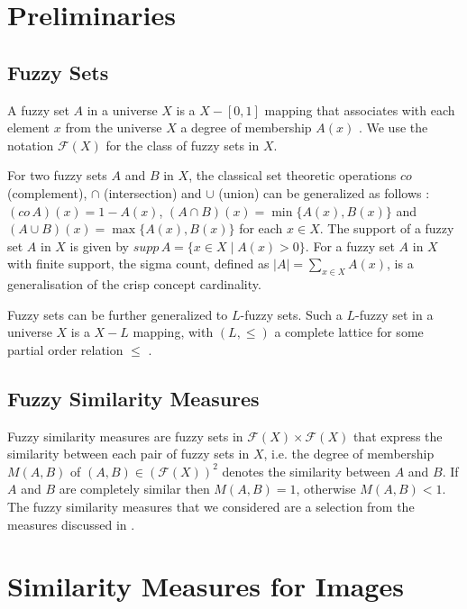 \documentclass[twocolumn]{phdsymp} %
\begin{document}
\section{Preliminaries}

\subsection{Fuzzy Sets}

A fuzzy set $A$ in a universe $X$ is a $X-[0,1]$ mapping that associates with each element
$x$ from the universe $X$ a degree of membership $A(x)$ \cite{kerre:vaagmodellen}. 
We use the notation ${\mathcal{F}}(X)$ for the class of fuzzy sets in $X$. 

For two fuzzy 
sets $A$ and $B$ in $X$, the classical set theoretic operations $co$ (complement), $\cap$ 
(intersection) and $\cup$ (union) can be generalized as follows 
\cite{kerre:vaagmodellen}: 
$(co\,A)(x)=1-A(x)$, $(A \cap B)(x)=\min\{A(x),B(x)\}$ and 
$(A \cup B)(x)=\max\{A(x),B(x)\}$ for each $x \in X$. The support of a fuzzy set
$A$ in $X$ is given by $supp\,A = \{x\in X \mid A(x) > 0\}$. For a fuzzy set $A$ in $X$ with
finite support, the sigma count, defined as $|A|=\sum_{x \in X} A(x)$, is a generalisation 
of the crisp concept cardinality.

Fuzzy sets can be further generalized to $L$-fuzzy sets. Such a $L$-fuzzy set in a universe
$X$ is a $X-L$ mapping, with $(L,\le)$ a complete lattice for some partial order relation 
$\le$ \cite{kerre:vaagmodellen}.  

\subsection{Fuzzy Similarity Measures}

Fuzzy similarity measures are
fuzzy sets in ${\mathcal{F}}(X) \times {\mathcal{F}}(X)$ that express the similarity between
each pair of fuzzy sets in $X$, i.e. the degree of membership $M(A,B)$ of 
$(A,B) \in ({\mathcal{F}}(X))^{2}$ denotes the similarity between $A$ and $B$. If $A$ and $B$
are completely similar then $M(A,B)=1$, otherwise $M(A,B)<1$. The fuzzy similarity measures
that we considered are a selection from the measures discussed in 
\cite{vanderweken:similariteitsmaten}.

\section{Similarity Measures for Images}
\end{document}
